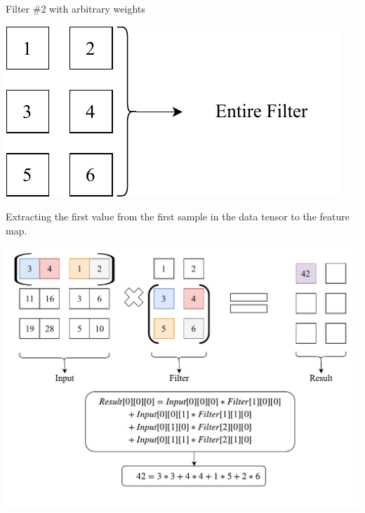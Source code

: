 \documentclass[12pt]{article}
\begin{document}
\begin{blockfigure}{Filter \#2 with arbitrary weights}
	\begin{center}
		\includegraphics[width=\textwidth]{filter2}
	\end{center}
\end{blockfigure}
\newpage
\begin{blockfigure}{ Extracting the first value from the first sample in the data tensor to the feature map.}
	\begin{center}
		\includegraphics[width=\textwidth]{secondConvSample_step1}
	\end{center}
\end{blockfigure}
\end{document}
